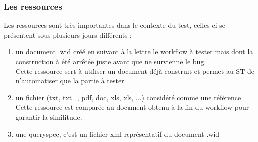 \subsubsection{Les ressources}
Les ressources sont très importantes dans le contexte du test, celles-ci se présentent sous plusieurs jours différents :
\begin{enumerate}
	\item un document .wid créé en suivant à la lettre le workflow à tester mais dont la construction à été arr\^{e}tée juste avant que ne survienne le bug.\\
	Cette ressource sert à utiliser un document déjà construit et permet au ST de n'automatiser que la partie à tester.
	\item un fichier (txt, txt\_, pdf, doc, xls, xls, ...) considéré comme une référence\\
	Cette ressource est comparée au document obtenu à la fin du workflow pour garantir la similitude.
	\item une queryspec, c'est un fichier xml représentatif du document .wid
\end{enumerate}

